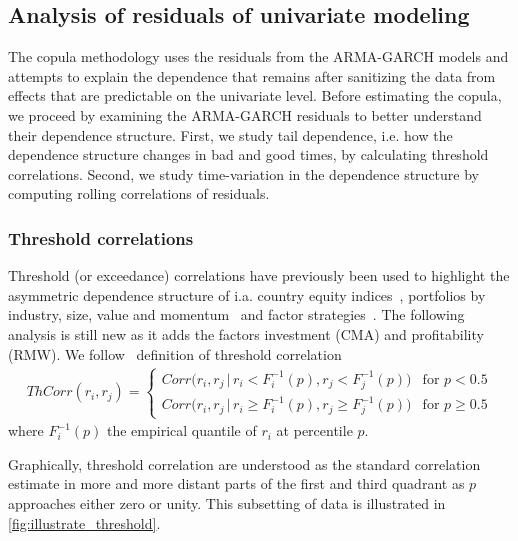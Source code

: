 \subsection{Analysis of residuals of univariate modeling} %
\label{subsec:multivariate_dependence}

The copula methodology uses the residuals from the ARMA-GARCH models and attempts to explain the dependence that remains after sanitizing the data from effects that are predictable on the univariate level. Before estimating the copula, we proceed by examining the ARMA-GARCH residuals to better understand their dependence structure. First, we study tail dependence, i.e. how the dependence structure changes in bad and good times, by calculating threshold correlations. Second, we study time-variation in the dependence structure by computing rolling correlations of residuals.

\subsubsection{Threshold correlations}
\label{subsubsec:threshold_corr}
Threshold (or exceedance) correlations have previously been used to highlight the asymmetric dependence structure of i.a. country equity indices~\autocite{LonginSolnik2001}, portfolios by industry, size, value and momentum~\autocite{AngChen2002} and factor strategies~\autocite{ChristoffersenLanglois2013}. The following analysis is still new as it adds the factors investment (CMA) and profitability (RMW). We follow~\textcite{ChristoffersenLanglois2013} definition of threshold correlation
\begin{align}
    ThCorr(r_i, r_j) = 
    \begin{cases} 
        Corr\Big(r_i, r_j \,|\, r_i < F_i^{-1}(p), r_j < F_j^{-1}(p)\Big)  & \text{for } p < 0.5 \\
        Corr\Big(r_i, r_j \,|\, r_i \geq F_i^{-1}(p), r_j \geq F_j^{-1}(p)\Big)  & \text{for } p \geq 0.5
    \end{cases}
\end{align}
where $F_i^{-1}(p)$ the empirical quantile of $r_i$ at percentile $p$. 

Graphically, threshold correlation are understood as the standard correlation estimate in more and more distant parts of the first and third quadrant as $p$ approaches either zero or unity. This subsetting of data is illustrated in \autoref{fig:illustrate_threshold}. 


